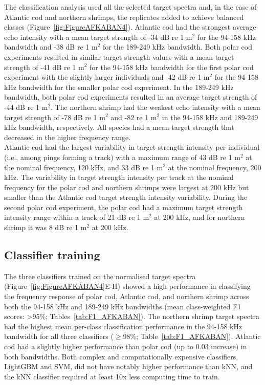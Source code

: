 {The classification analysis used all the selected target spectra and, in the case of Atlantic cod and northern shrimps, the replicates added to achieve balanced classes (Figure~\ref{fig:FigureAFKABAN4}). Atlantic cod had the strongest average echo intensity with a mean target strength of -34 dB re 1 m$^2$ for the 94-158 kHz bandwidth and -38 dB re 1 m$^2$ for the 189-249 kHz bandwidth. Both polar cod experiments resulted in similar target strength values with a mean target strength of -41 dB re 1 m$^2$ for the 94-158 kHz bandwidth for the first polar cod experiment with the slightly larger individuals and -42 dB re 1 m$^2$ for the 94-158 kHz bandwidth for the smaller polar cod experiment. In the 189-249 kHz bandwidth, both polar cod experiments resulted in an average target strength of -44 dB re 1 m$^2$. The northern shrimp had the weakest echo intensity with a mean target strength of -78 dB re 1 m$^2$ and -82 re 1 m$^2$ in the 94-158 kHz and 189-249 kHz bandwidth, respectively. All species had a mean target strength that decreased in the higher frequency range. \\
Atlantic cod had the largest variability in target strength intensity per individual (i.e., among pings forming a track) with a maximum range of 43 dB re 1 m$^2$ at the nominal frequency, 120 kHz, and 33 dB re 1 m$^2$ at the nominal frequency, 200 kHz. The variability in target strength intensity per track at the nominal frequency for the polar cod and northern shrimps were largest at 200 kHz but smaller than the Atlantic cod target strength intensity variability. During the second polar cod experiment, the polar cod had a maximum target strength intensity range within a track of 21 dB re 1 m$^2$ at 200 kHz, and for northern shrimp it was 8 dB re 1 m$^2$ at 200 kHz.\\


\subsection{Classifier training}
The three classifiers trained on the normalised target spectra (Figure~\ref{fig:FigureAFKABAN4}E-H) showed a high performance in classifying the frequency response of polar cod, Atlantic cod, and northern shrimp across both the 94-158 kHz and 189-249 kHz bandwidths (mean class-weighted F1 scores: >95\%; Tables~\ref{tab:F1_AFKABAN}). The northern shrimp target spectra had the highest mean per-class classification performance in the 94-158 kHz bandwidth for all three classifiers ($\geq$98\%; Table~\ref{tab:F1_AFKABAN}). Atlantic cod had a slightly higher performance than polar cod (up to 0.03 increase) in both bandwidths. Both complex and computationally expensive classifiers, LightGBM and SVM, did not have notably higher performance than kNN, and the kNN classifier required at least 10x less computing time to train. \\

}
